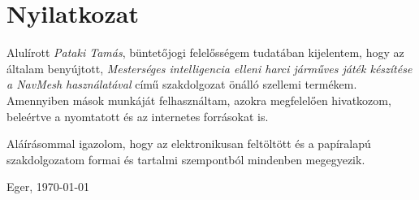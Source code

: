 \documentclass{thesis-ekf}
\begin{document}
\chapter*{Nyilatkozat}

Alulírott \emph{Pataki Tamás}, büntetőjogi felelősségem tudatában kijelentem, hogy az általam benyújtott, \emph{Mesterséges intelligencia elleni harci járműves játék készítése a NavMesh használatával} című szakdolgozat önálló szellemi termékem. Amennyiben mások munkáját felhasználtam, azokra megfelelően hivatkozom, beleértve a nyomtatott és az internetes forrásokat is.

Aláírásommal igazolom, hogy az elektronikusan feltöltött és a papíralapú szakdolgozatom formai és tartalmi szempontból mindenben megegyezik.

\bigskip
\begin{flushleft}
Eger, \today
\end{flushleft}

\medskip
\begin{flushright}
\end{flushright}

%
\end{document}
